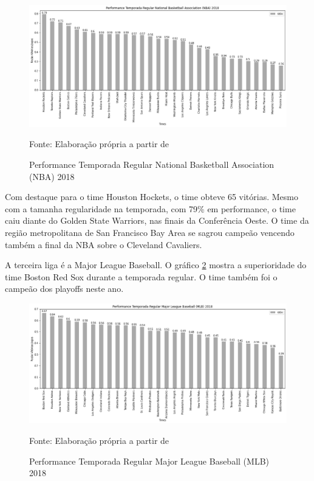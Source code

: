\documentclass[12pt,oneside,a4paper,chapter=TITLE,english,brazil,sumario=abnt-6027-2012]{abntex2}
\begin{document}
	\begin{figure}[htbp]
		\centering
		\caption{Performance Temporada Regular National Basketball Association (NBA) 2018}
		\includegraphics[scale=0.4]{../../output/figures/nba.png}
		\label{nba}
		\\ \vspace{0.25cm}
		\raggedright
		\footnotesize{Fonte: Elaboração própria a partir de }
	\end{figure}
	
	Com destaque para o time Houston Hockets, o time obteve 65 vitórias. Mesmo com a tamanha regularidade na temporada, com 79\% em performance, o time caiu diante do Golden State Warriors, nas finais da Conferência Oeste. O time da região metropolitana de San Francisco Bay Area se sagrou campeão vencendo também a final da NBA sobre o Cleveland Cavaliers.
	
	A terceira liga é a Major League Baseball. O gráfico \ref{mlb} mostra a superioridade do time Boston Red Sox durante a temporada regular. O time também foi o campeão dos playoffs neste ano.
	
	\begin{figure}[htbp]
		\centering
		\caption{Performance Temporada Regular Major League Baseball (MLB) 2018}
		\includegraphics[scale=0.4]{../../output/figures/mlb.png}
		\label{mlb}
		\\ \vspace{0.25cm}
		\raggedright
		\footnotesize{Fonte: Elaboração própria a partir de }
	\end{figure}
	
\end{document}
